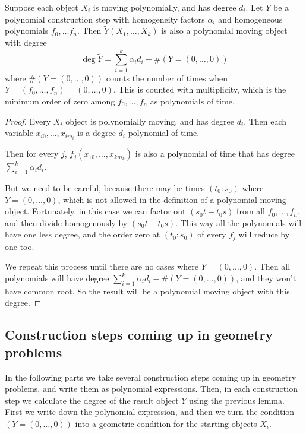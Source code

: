 \documentclass[a4paper]{article}
\begin{document}
\begin{lemma} \label{polyconst}
    Suppose each object $X_i$ is moving polynomially, and has degree $d_i$. Let $Y$ be a polynomial construction step with homogeneity factors $\alpha_i$ and homogeneous polynomials $f_0,\ldots f_n$. Then $\tilde{Y}(X_1,\ldots,X_k)$ is also a polynomial moving object with degree
    $$\deg \tilde{Y}=\sum_{i=1}^k \alpha_id_i-\#(Y=(0,\ldots,0))$$
    where $\#(Y=(0,\ldots,0))$ counts the number of times when $Y=(f_0,\ldots ,f_n)=(0,\ldots,0)$. This is counted with multiplicity, which is the minimum order of zero among $f_0,\ldots, f_n$ as polynomials of time.
\end{lemma}
\begin{proof}
    Every $X_i$ object is polynomially moving, and has degree $d_i$. Then each variable $x_{i0},\ldots ,x_{im_i}$ is a degree $d_i$ polynomial of time.

    Then for every $j$, $f_j(x_{10},\ldots ,x_{km_k})$ is also a polynomial of time that has degree $\sum_{i=1}^k \alpha_id_i$.

    But we need to be careful, because there may be times $(t_0:s_0)$ where $Y=(0,\ldots,0)$, which is not allowed in the definition of a polynomial moving object. Fortunately, in this case we can factor out $(s_0t-t_0s)$ from all $f_0,\ldots, f_n$, and then divide homogenously by $(s_0t-t_0s)$. This way all the polynomials will have one less degree, and the order zero at $(t_0:s_0)$ of every $f_j$ will reduce by one too.

    We repeat this process until there are no cases where $Y=(0,\ldots,0)$. Then all polynomials will have degree $\sum_{i=1}^k \alpha_id_i-\#(Y=(0,\ldots,0))$, and they won't have common root. So the result will be a polynomial moving object with this degree.
\end{proof}

\subsection{Construction steps coming up in geometry problems}

In the following parts we take several construction steps coming up in geometry problems, and write them as polynomial expressions. Then, in each construction step we calculate the degree of the result object $Y$ using the previous lemma. First we write down the polynomial expression, and then we turn the condition $(Y=(0,\ldots,0))$ into a geometric condition for the starting objects $X_i$.
\end{document}
